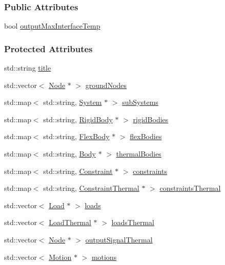 \subsubsection*{Public Attributes}
\begin{DoxyCompactItemize}
\item 
bool \hyperlink{classmknix_1_1_system_ab55e1b00bf920164cfe14d0ea9ab08c6}{output\+Max\+Interface\+Temp}
\end{DoxyCompactItemize}
\subsubsection*{Protected Attributes}
\begin{DoxyCompactItemize}
\item 
std\+::string \hyperlink{classmknix_1_1_system_a2dcd01381b3eec7b2e8e2c1c3ab38972}{title}
\item 
std\+::vector$<$ \hyperlink{classmknix_1_1_node}{Node} $\ast$ $>$ \hyperlink{classmknix_1_1_system_a510d1808d1c0bce06b2d46707d8dddb5}{ground\+Nodes}
\item 
std\+::map$<$ std\+::string, \hyperlink{classmknix_1_1_system}{System} $\ast$ $>$ \hyperlink{classmknix_1_1_system_a90dd5d1e76958c720a2bad6e9bd4ceb2}{sub\+Systems}
\item 
std\+::map$<$ std\+::string, \hyperlink{classmknix_1_1_rigid_body}{Rigid\+Body} $\ast$ $>$ \hyperlink{classmknix_1_1_system_ac39f69fd16a8c74a79dc3258e4f9c505}{rigid\+Bodies}
\item 
std\+::map$<$ std\+::string, \hyperlink{classmknix_1_1_flex_body}{Flex\+Body} $\ast$ $>$ \hyperlink{classmknix_1_1_system_a20ca9590b01b280feb622ac158fcf4ba}{flex\+Bodies}
\item 
std\+::map$<$ std\+::string, \hyperlink{classmknix_1_1_body}{Body} $\ast$ $>$ \hyperlink{classmknix_1_1_system_a5f3e180ba138e01570ffe8aba62a1df7}{thermal\+Bodies}
\item 
std\+::map$<$ std\+::string, \hyperlink{classmknix_1_1_constraint}{Constraint} $\ast$ $>$ \hyperlink{classmknix_1_1_system_a6777972d1e5914dbe488e704ca8a0b8d}{constraints}
\item 
std\+::map$<$ std\+::string, \hyperlink{classmknix_1_1_constraint_thermal}{Constraint\+Thermal} $\ast$ $>$ \hyperlink{classmknix_1_1_system_abec0485325cb37e460f9f8eab40374ea}{constraints\+Thermal}
\item 
std\+::vector$<$ \hyperlink{classmknix_1_1_load}{Load} $\ast$ $>$ \hyperlink{classmknix_1_1_system_a16ca73ebcb7b8608052e1a39766c034d}{loads}
\item 
std\+::vector$<$ \hyperlink{classmknix_1_1_load_thermal}{Load\+Thermal} $\ast$ $>$ \hyperlink{classmknix_1_1_system_a4895395f658cd48585a7336acd9d6625}{loads\+Thermal}
\item 
std\+::vector$<$ \hyperlink{classmknix_1_1_node}{Node} $\ast$ $>$ \hyperlink{classmknix_1_1_system_a7e1b0adf59579754f0863b3fd9864b21}{output\+Signal\+Thermal}
\item 
std\+::vector$<$ \hyperlink{classmknix_1_1_motion}{Motion} $\ast$ $>$ \hyperlink{classmknix_1_1_system_a5555b9556c466244816bc6654e73d8f6}{motions}
\end{DoxyCompactItemize}
